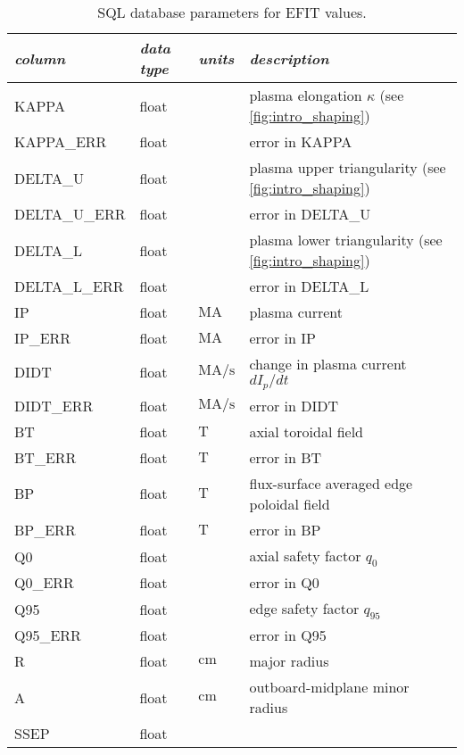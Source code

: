  \begin{longtabu} to 150mm {X[2.348,l]X[1,c]X[1,c]X[4.348,c]}
 \caption{SQL database parameters for EFIT values.}\label{tab:sql_efit} \\

 \toprule
 \emph{column} &
 \emph{data type} &
 \emph{units} &
 \emph{description}
 \\
 \midrule
 \endfirsthead
 \endhead

 \endfoot
 \bottomrule
 \endlastfoot

 KAPPA &
 float &
 &
 plasma elongation $\kappa$ (see \cref{fig:intro_shaping})
 \\
 KAPPA\_ERR &
 float &
 &
 error in KAPPA
 \\
 DELTA\_U &
 float &
 &
 plasma upper triangularity (see \cref{fig:intro_shaping})
 \\
 DELTA\_U\_ERR &
 float &
 &
 error in DELTA\_U
 \\
 DELTA\_L &
 float &
 &
 plasma lower triangularity (see \cref{fig:intro_shaping})
 \\
 DELTA\_L\_ERR &
 float &
 &
 error in DELTA\_L
 \\
 IP &
 float &
 $\si{\mega\ampere}$ &
 plasma current
 \\
 IP\_ERR &
 float &
 $\si{\mega\ampere}$ &
 error in IP
 \\
 DIDT &
 float &
 $\si{\mega\ampere\per\second}$ &
 change in plasma current $dI_p/dt$
 \\
 DIDT\_ERR &
 float &
 $\si{\mega\ampere\per\second}$ &
 error in DIDT
 \\
 BT &
 float &
 $\si{\tesla}$ &
 axial toroidal field
 \\
 BT\_ERR &
 float &
 $\si{\tesla}$ &
 error in BT
 \\
 BP &
 float &
 $\si{\tesla}$ &
 flux-surface averaged edge poloidal field
 \\
 BP\_ERR &
 float &
 $\si{\tesla}$ &
 error in BP
 \\
 Q0 &
 float &
 &
 axial safety factor $q_0$
 \\
 Q0\_ERR &
 float &
 &
 error in Q0
 \\
 Q95 &
 float &
 &
 edge safety factor $q_{95}$
 \\
 Q95\_ERR &
 float &
 &
 error in Q95
 \\
 R &
 float &
 $\si{\centi\meter}$ &
 major radius
 \\
 A &
 float &
 $\si{\centi\meter}$ &
 outboard-midplane minor radius
 \\
 SSEP &
 float &

\end{longtabu}
